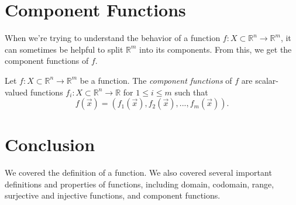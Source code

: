 \documentclass{ximera}
\begin{document}
\section{Component Functions}

When we're trying to understand the behavior of a function $f:X\subset \mathbb{R}^n\rightarrow \mathbb{R}^m$, it can sometimes be helpful to split $\mathbb{R}^m$ into its components. From this, we get the component functions of $f$.

\begin{definition}
Let $f:X\subset \mathbb{R}^n\rightarrow \mathbb{R}^m$ be a function. The \emph{component functions} of $f$ are scalar-valued functions $f_i:X\subset\mathbb{R}^n\rightarrow\mathbb{R}$ for $1\leq i\leq m$ such that 
\[
f(\vec{x}) = (f_1(\vec{x}),f_2(\vec{x}),...,f_m(\vec{x})).
\]
\end{definition}

\section{Conclusion}

We covered the definition of a function. We also covered several important definitions and properties of functions, including domain, codomain, range, surjective and injective functions, and component functions.
\end{document}
